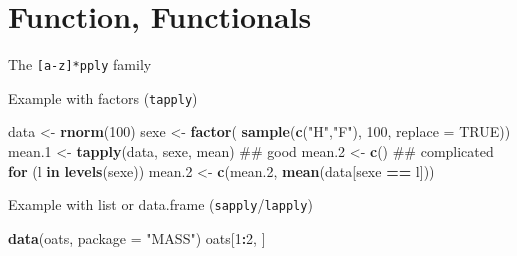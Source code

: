 \documentclass[10pt,ignorenonframetext,]{beamer}
\newenvironment{Shaded}{\begin{snugshade}}{\end{snugshade}}
\newcommand{\KeywordTok}[1]{\textcolor[rgb]{0.13,0.29,0.53}{\textbf{#1}}}
\newcommand{\DataTypeTok}[1]{\textcolor[rgb]{0.13,0.29,0.53}{#1}}
\newcommand{\DecValTok}[1]{\textcolor[rgb]{0.00,0.00,0.81}{#1}}
\newcommand{\StringTok}[1]{\textcolor[rgb]{0.31,0.60,0.02}{#1}}
\newcommand{\OtherTok}[1]{\textcolor[rgb]{0.56,0.35,0.01}{#1}}
\newcommand{\ControlFlowTok}[1]{\textcolor[rgb]{0.13,0.29,0.53}{\textbf{#1}}}
\newcommand{\OperatorTok}[1]{\textcolor[rgb]{0.81,0.36,0.00}{\textbf{#1}}}
\newcommand{\NormalTok}[1]{#1}
\begin{document}
\section{Function, Functionals}\label{function-functionals}

\begin{frame}{The \texttt{{[}a-z{]}*pply}
family}

\begin{block}{Example with factors (\texttt{tapply})}

\scriptsize

\begin{Shaded}
\begin{Highlighting}[]
\NormalTok{data <-}\StringTok{ }\KeywordTok{rnorm}\NormalTok{(}\DecValTok{100}\NormalTok{)}
\NormalTok{sexe <-}\StringTok{ }\KeywordTok{factor}\NormalTok{( }\KeywordTok{sample}\NormalTok{(}\KeywordTok{c}\NormalTok{(}\StringTok{"H"}\NormalTok{,}\StringTok{"F"}\NormalTok{), }\DecValTok{100}\NormalTok{, }\DataTypeTok{replace =} \OtherTok{TRUE}\NormalTok{))}
\NormalTok{mean.}\DecValTok{1}\NormalTok{ <-}\StringTok{ }\KeywordTok{tapply}\NormalTok{(data, sexe, mean) ## good}
\NormalTok{mean.}\DecValTok{2}\NormalTok{ <-}\StringTok{ }\KeywordTok{c}\NormalTok{()  ## complicated}
\ControlFlowTok{for}\NormalTok{ (l }\ControlFlowTok{in} \KeywordTok{levels}\NormalTok{(sexe))}
\NormalTok{  mean.}\DecValTok{2}\NormalTok{ <-}\StringTok{ }\KeywordTok{c}\NormalTok{(mean.}\DecValTok{2}\NormalTok{, }\KeywordTok{mean}\NormalTok{(data[sexe }\OperatorTok{==}\StringTok{ }\NormalTok{l]))}
\end{Highlighting}
\end{Shaded}

\normalsize

\end{block}

\begin{block}{Example with list or data.frame
(\texttt{sapply}/\texttt{lapply})}

\scriptsize

\begin{Shaded}
\begin{Highlighting}[]
\KeywordTok{data}\NormalTok{(oats, }\DataTypeTok{package =} \StringTok{"MASS"}\NormalTok{)}
\NormalTok{oats[}\DecValTok{1}\OperatorTok{:}\DecValTok{2}\NormalTok{, ]}
\end{Highlighting}
\end{Shaded}

\color{gray}


\end{block}
\end{frame}
\end{document}
